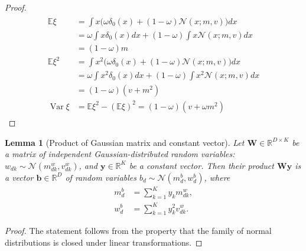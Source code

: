 \documentclass[letterpaper]{article}
\newtheorem{lemma}{Lemma}
\begin{document}
\begin{proof}
\begin{align*}
\begin{split}
\mathbb{E}\xi &= \int x \big(\omega \delta_0(x) + (1 - \omega)\mathcal{N}(x; m, v)\big)dx \\
& = \omega \int x \delta_0(x)dx + (1 - \omega)\int x \mathcal{N}(x; m, v)dx \\
& = (1-\omega)m \\
\mathbb{E}\xi^2 &= \int x^2 \big(\omega \delta_0(x) + (1 - \omega)\mathcal{N}(x; m, v)\big)dx \\
& = \omega \int x^2 \delta_0(x)dx + (1 - \omega)\int x^2 \mathcal{N}(x; m, v)dx \\
& = (1-\omega)(v + m^2) \\
\operatorname{Var}\xi &= \mathbb{E}\xi^2 - \left(\mathbb{E}\xi\right)^2 = (1-\omega)(v + \omega m^2)
\end{split}
\end{align*}
\end{proof}

 \begin{lemma}[Product of Gaussian matrix and constant vector]
 \label{thm:matrix_const}
 Let $\mathbf{W} \in \mathbb{R}^{D \times K}$ be a matrix of independent Gaussian-distributed random variables: $w_{dk} \sim \mathcal{N}(m^w_{dk}, v^w_{dk})$, and $\mathbf{y} \in \mathbb{R}^K$ be a constant vector. Then their product $\mathbf{W} \mathbf{y}$ is a vector $\mathbf{b} \in \mathbb{R}^{D}$ of random variables $b_d \sim \mathcal{N}(m^b_d, w^b_d)$, where 
\begin{subequations}
\begin{align}
m^b_d &= \sum_{k=1}^Ky_k m^w_{dk}, \\
w^b_d &= \sum_{k=1}^Ky_k^2v^w_{dk}.
 \end{align}
\end{subequations}
 
 \end{lemma}
 \begin{proof}
 	The statement follows from the property that the family of normal distributions is closed under linear transformations.
 \end{proof}
 
\end{document}
